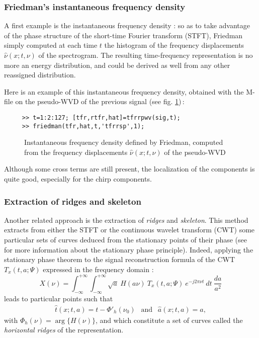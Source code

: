 \subsubsection{Friedman's instantaneous frequency density}
A first example is the instantaneous frequency density : so as to take
advantage of the phase structure of the short-time Fourier transform
(STFT), Friedman simply computed at each time $t$ the histogram of the
frequency displacements $\hat{\nu}(x;t,\nu)$ of the spectrogram. The
resulting time-frequency representation is no more an energy
distribution, and could be derived as well from any other reassigned
distribution.

Here is an example of this instantaneous frequency density, obtained with
the M-file  on the
pseudo-WVD of the previous signal (see fig. \ref{Re1fig5})\,:
\begin{verbatim}
     >> t=1:2:127; [tfr,rtfr,hat]=tfrrpwv(sig,t);
     >> friedman(tfr,hat,t,'tfrrsp',1);
\end{verbatim}
\begin{figure}[htb]
\epsfxsize=10cm
\epsfysize=10cm
\centerline{}
\caption{\label{Re1fig5}Instantaneous frequency density defined by
Friedman, computed from the frequency displacements $\hat{\nu}(x;t,\nu)$ of
the pseudo-WVD}
\end{figure}
Although some cross terms are still present, the localization of the
components is quite good, especially for the chirp components.


\subsubsection{Extraction of ridges and skeleton}
 Another related approach is the extraction
of {\it ridges} and {\it skeleton}. This method extracts from either the
STFT or the continuous wavelet transform (CWT) some particular sets of
curves deduced from the stationary points of their phase (see \cite{FLA93}
for more information about the stationary phase principle). Indeed,
applying the stationary phase theorem to the signal reconstruction formula
of the CWT $T_x(t,a;\Psi)$ expressed in the frequency domain :
\[X(\nu)=\int_{-\infty}^{+\infty}\int_{-\infty}^{+\infty} \sqrt{a}\ H(a
\nu)\ T_x(t,a;\Psi)\ e^{-j2\pi \nu t}\ dt\ 
\frac{da}{a^2}\] 
leads to particular points such that 
\begin{eqnarray}
\label{hatt1}
\hat{t}(x;t,a)=t-\Phi'_h(\nu_0)\ \ \mbox{ and }\ \ \hat{a}(x;t,a)=a,	
\end{eqnarray}
with $\Phi_h(\nu)=\arg\{H(\nu)\}$, and which constitute a set of curves
called the {\it horizontal ridges} of the representation. 

